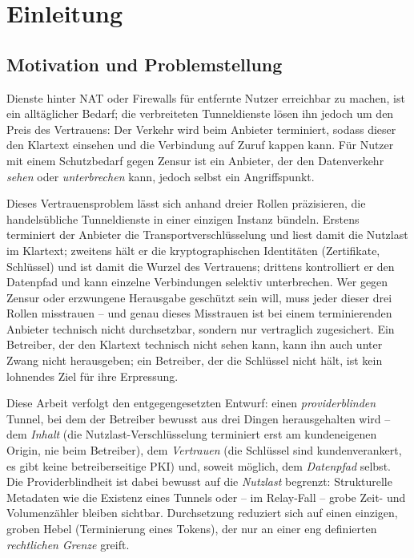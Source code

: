 \chapter{Einleitung}
\label{ch:einleitung}

\section{Motivation und Problemstellung}
\label{sec:motivation}

Dienste hinter NAT oder Firewalls für entfernte Nutzer erreichbar zu machen,
ist ein alltäglicher Bedarf; die verbreiteten Tunneldienste lösen ihn jedoch um
den Preis des Vertrauens: Der Verkehr wird beim Anbieter terminiert, sodass
dieser den Klartext einsehen und die Verbindung auf Zuruf kappen kann. Für
Nutzer mit einem Schutzbedarf gegen Zensur ist ein Anbieter, der den Datenverkehr
\emph{sehen} oder \emph{unterbrechen} kann, jedoch selbst ein Angriffspunkt.

Dieses Vertrauensproblem lässt sich anhand dreier Rollen präzisieren, die
handelsübliche Tunneldienste in einer einzigen Instanz bündeln. Erstens
terminiert der Anbieter die Transportverschlüsselung und liest damit die
Nutzlast im Klartext; zweitens hält er die kryptographischen Identitäten
(Zertifikate, Schlüssel) und ist damit die Wurzel des Vertrauens; drittens
kontrolliert er den Datenpfad und kann einzelne Verbindungen selektiv
unterbrechen. Wer gegen Zensur oder erzwungene Herausgabe geschützt sein will,
muss jeder dieser drei Rollen misstrauen -- und genau dieses Misstrauen ist bei
einem terminierenden Anbieter technisch nicht durchsetzbar, sondern nur
vertraglich zugesichert. Ein Betreiber, der den Klartext technisch nicht sehen
kann, kann ihn auch unter Zwang nicht herausgeben; ein Betreiber, der die
Schlüssel nicht hält, ist kein lohnendes Ziel für ihre Erpressung.

Diese Arbeit verfolgt den entgegengesetzten Entwurf: einen
\emph{providerblinden} Tunnel, bei dem der Betreiber
bewusst aus drei Dingen herausgehalten wird -- dem \emph{Inhalt} (die
Nutzlast-Verschlüsselung terminiert erst am kundeneigenen Origin, nie beim
Betreiber), dem \emph{Vertrauen} (die Schlüssel sind kundenverankert, es gibt
keine betreiberseitige PKI) und, soweit möglich, dem \emph{Datenpfad} selbst.
Die Providerblindheit ist dabei bewusst auf die \emph{Nutzlast}
begrenzt: Strukturelle Metadaten wie die Existenz eines Tunnels oder -- im
Relay-Fall -- grobe Zeit- und Volumenzähler bleiben sichtbar. Durchsetzung
reduziert sich auf einen einzigen, groben Hebel (Terminierung eines Tokens),
der nur an einer eng definierten \emph{rechtlichen Grenze} greift.

